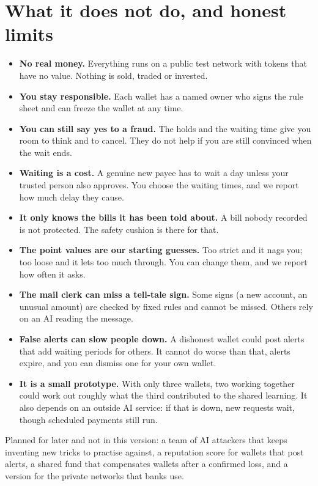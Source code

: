 \documentclass[11pt,a4paper]{article}
\begin{document}
\section{What it does not do, and honest limits}

\begin{itemize}
\item \textbf{No real money.} Everything runs on a public test network with tokens that
have no value. Nothing is sold, traded or invested.
\item \textbf{You stay responsible.} Each wallet has a named owner who signs the rule
sheet and can freeze the wallet at any time.
\item \textbf{You can still say yes to a fraud.} The holds and the waiting time give you
room to think and to cancel. They do not help if you are still convinced when the wait
ends.
\item \textbf{Waiting is a cost.} A genuine new payee has to wait a day unless your
trusted person also approves. You choose the waiting times, and we report how much delay
they cause.
\item \textbf{It only knows the bills it has been told about.} A bill nobody recorded is
not protected. The safety cushion is there for that.
\item \textbf{The point values are our starting guesses.} Too strict and it nags you; too
loose and it lets too much through. You can change them, and we report how often it asks.
\item \textbf{The mail clerk can miss a tell-tale sign.} Some signs (a new account, an
unusual amount) are checked by fixed rules and cannot be missed. Others rely on an AI
reading the message.
\item \textbf{False alerts can slow people down.} A dishonest wallet could post alerts
that add waiting periods for others. It cannot do worse than that, alerts expire, and
you can dismiss one for your own wallet.
\item \textbf{It is a small prototype.} With only three wallets, two working together
could work out roughly what the third contributed to the shared learning. It also
depends on an outside AI service: if that is down, new requests wait, though scheduled
payments still run.
\end{itemize}

Planned for later and not in this version: a team of AI attackers that keeps inventing
new tricks to practise against, a reputation score for wallets that post alerts, a shared
fund that compensates wallets after a confirmed loss, and a version for the private
networks that banks use.
\end{document}
